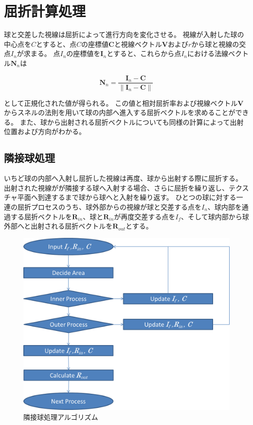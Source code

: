 \section{屈折計算処理}
\label{SRefraction}

球と交差した視線は屈折によって進行方向を変化させる。
視線が入射した球の中心点を$C$とすると、点$C$の座標値$\bm{C}$と視線ベクトル$\bm{V}$および$r$から球と視線の交点$I_n$が求まる\figref{}。
点$I_n$の座標値を$\bm{I}_n$とすると、これらから点$I_n$における法線ベクトル$\bm{N}_n$は

\begin{equation}
\label{ENd}
\bm{N}_n = \frac{\bm{I}_n - \bm{C}}{\|\bm{I}_n - \bm{C}\|}
\end{equation}

\noindent
として正規化された値が得られる。
この値と相対屈折率および視線ベクトル$\bm{V}$からスネルの法則を用いて球の内部へ進入する屈折ベクトルを求めることができる。
また、球から出射される屈折ベクトルについても同様の計算によって出射位置および方向がわかる。

\subsection{隣接球処理}
\label{SSMultiRefraction}

いちど球の内部へ入射し屈折した視線は再度、球から出射する際に屈折する。
出射された視線がが隣接する球へ入射する場合、さらに屈折を繰り返し、テクスチャ平面へ到達するまで球から球へと入射を繰り返す。
ひとつの球に対する一連の屈折プロセスのうち、球外部からの視線が球と交差する点を$I_n$、球内部を通過する屈折ベクトルを$\bm{R}_{in}$、球と$\bm{R}_{in}$が再度交差する点を$I_f$、そして球内部から球外部へと出射される屈折ベクトルを$\bm{R}_{out}$とする。

\begin{figure}[h]
  \centering
  \includegraphics[width=4.5in]{./img/graph/next_sphere_algorithm.png}
  \caption{隣接球処理アルゴリズム}
  \label{FAlgoNextSphere}
\end{figure}

